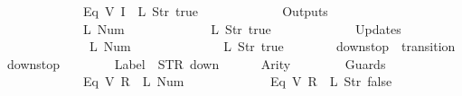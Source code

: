 \begin{isabellebody}
\ \ \ \ \ \ \ \ \ \ \ \ {\isacharparenleft}Eq\ {\isacharparenleft}V\ {\isacharparenleft}I\ {}{\isacharparenright}{\isacharparenright}\ {\isacharparenleft}L\ {\isacharparenleft}Str\ {\isacharprime}{\isacharprime}true{\isacharprime}{\isacharprime}{\isacharparenright}{\isacharparenright}{\isacharparenright}\isanewline
\ \ \ \ \ \ {\isacharbrackright}{\isacharcomma}\isanewline
\ \ \ \ \ \ Outputs\ {\isacharequal}\ {\isacharbrackleft}\isanewline
\ \ \ \ \ \ \ \ \ \ \ \ {\isacharparenleft}L\ {\isacharparenleft}Num\ {}{\isacharparenright}{\isacharparenright}{\isacharcomma}\isanewline
\ \ \ \ \ \ \ \ \ \ \ \ {\isacharparenleft}L\ {\isacharparenleft}Str\ {\isacharprime}{\isacharprime}true{\isacharprime}{\isacharprime}{\isacharparenright}{\isacharparenright}\isanewline
\ \ \ \ \ \ {\isacharbrackright}{\isacharcomma}\isanewline
\ \ \ \ \ \ Updates\ {\isacharequal}\ {\isacharbrackleft}\isanewline
\ \ \ \ \ \ \ \ \ \ \ \ {\isacharparenleft}{}{\isacharcomma}\ {\isacharparenleft}L\ {\isacharparenleft}Num\ {}{\isacharparenright}{\isacharparenright}{\isacharparenright}{\isacharcomma}\isanewline
\ \ \ \ \ \ \ \ \ \ \ \ {\isacharparenleft}{}{\isacharcomma}\ {\isacharparenleft}L\ {\isacharparenleft}Str\ {\isacharprime}{\isacharprime}true{\isacharprime}{\isacharprime}{\isacharparenright}{\isacharparenright}{\isacharparenright}\isanewline
\ \ \ \ \ \ {\isacharbrackright}\isanewline
{\isasymrparr}{\isachardoublequoteclose}\isanewline
\isanewline
{}\isamarkupfalse%
\ {\isachardoublequoteopen}down{}{}stop{\isachardoublequoteclose}\ {\isacharcolon}{\isacharcolon}\ {\isachardoublequoteopen}transition{\isachardoublequoteclose}\ \isanewline
{\isachardoublequoteopen}down{}{}stop\ {\isasymequiv}\ {\isasymlparr}\isanewline
\ \ \ \ \ \ Label\ {\isacharequal}\ STR\ {\isacharprime}{\isacharprime}down{\isacharprime}{\isacharprime}{\isacharcomma}\isanewline
\ \ \ \ \ \ Arity\ {\isacharequal}\ {}{\isacharcomma}\isanewline
\ \ \ \ \ \ Guards\ {\isacharequal}\ {\isacharbrackleft}\isanewline
\ \ \ \ \ \ \ \ \ \ \ \ {\isacharparenleft}Eq\ {\isacharparenleft}V\ {\isacharparenleft}R\ {}{\isacharparenright}{\isacharparenright}\ {\isacharparenleft}L\ {\isacharparenleft}Num\ {}{\isacharparenright}{\isacharparenright}{\isacharparenright}{\isacharcomma}\isanewline
\ \ \ \ \ \ \ \ \ \ \ \ {\isacharparenleft}Eq\ {\isacharparenleft}V\ {\isacharparenleft}R\ {}{\isacharparenright}{\isacharparenright}\ {\isacharparenleft}L\ {\isacharparenleft}Str\ {\isacharprime}{\isacharprime}false{\isacharprime}{\isacharprime}{\isacharparenright}{\isacharparenright}{\isacharparenright}{\isacharcomma}\isanewline

\end{isabellebody}
